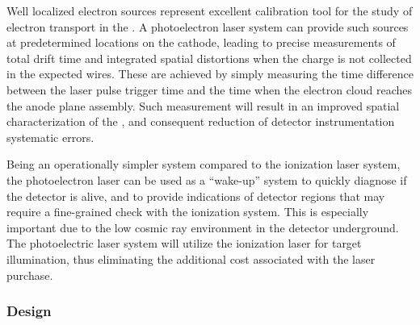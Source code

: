
Well localized electron sources represent excellent calibration tool for the study of electron transport in the . 
A photoelectron laser system can provide such sources at predetermined locations on the cathode, leading to precise  measurements of total drift time and integrated spatial distortions when the charge is not collected in the expected wires. These are achieved by simply measuring the time difference between the laser pulse trigger time and the time when the electron cloud reaches the anode plane assembly. Such measurement will result in an improved spatial characterization of the \efield, and consequent reduction of detector instrumentation systematic errors.

Being an operationally simpler system compared to the ionization laser system, the photoelectron laser can be used as a ``wake-up'' system to quickly diagnose if the detector is alive, and to provide indications of detector regions that may require a fine-grained check with the ionization system. This is especially important due to the low cosmic ray environment in the detector underground. The photoelectric laser system will utilize the ionization laser for target illumination, thus eliminating the additional cost associated with the laser purchase.


%

\subsubsection{Design}
\label{sec:sp-calib-sys-las-pe-des}

